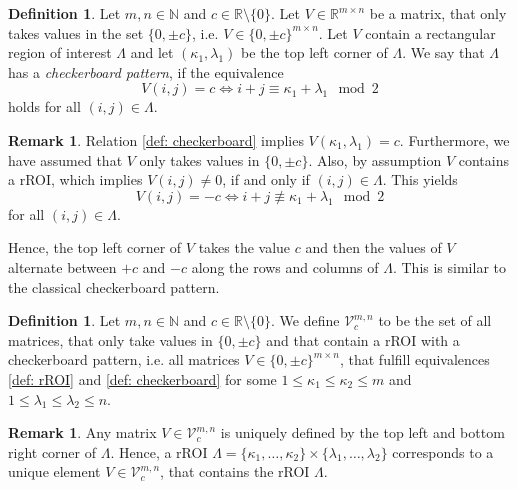 \documentclass[a4paper,12pt]{article}
\theoremstyle{plain}
\theoremstyle{definition}
\newtheorem{definition}[theorem]{Definition}
\newtheorem{remark}[theorem]{Remark}
\begin{document}
\begin{definition}
	Let $m, n \in \mathbb{N}$ and $c \in \mathbb{R} \setminus \{ 0 \}$. Let $V \in \mathbb{R}^{m \times n}$ be a matrix, that only takes values in the set $\{ 0, \pm c \}$, i.e. $V \in \{ 0, \pm c \}^{m \times n}$. Let $V$ contain a rectangular region of interest $\varLambda$ and let $(\kappa_1, \lambda_1)$ be the top left corner of $\varLambda$. We say that $\varLambda$ has a \emph{checkerboard pattern}, if the equivalence
	\begin{equation}\label{def: checkerboard}
		V(i, j) = c \Leftrightarrow i + j \equiv \kappa_1 + \lambda_1 \mod 2
	\end{equation}
	holds for all $(i, j) \in \varLambda$.
\end{definition}

\begin{remark}
	Relation \eqref{def: checkerboard} implies $V(\kappa_1, \lambda_1) = c$. Furthermore, we have assumed that $V$ only takes values in $\{ 0, \pm c \}$. Also, by assumption $V$ contains a rROI, which implies $V(i,j) \neq 0$, if and only if $(i, j) \in \varLambda$. This yields
	\begin{equation*}
		V(i, j) = - c \Leftrightarrow i + j \not\equiv \kappa_1 + \lambda_1 \mod 2
	\end{equation*}
	for all $(i, j) \in \varLambda$.
\end{remark}

Hence, the top left corner of $V$ takes the value $c$ and then the values of $V$ alternate between $+c$ and $-c$ along the rows and columns of $\varLambda$. This is similar to the classical checkerboard pattern.

\begin{definition}
	Let $m, n \in \mathbb{N}$ and $c \in \mathbb{R} \setminus \{ 0 \}$. We define $\mathcal{V}_c^{m, n}$ to be the set of all matrices, that only take values in $\{ 0, \pm c \}$ and that contain a rROI with a checkerboard pattern, i.e. all matrices  $V \in \{ 0, \pm c \}^{m \times n}$, that fulfill equivalences \eqref{def: rROI} and \eqref{def: checkerboard} for some $1 \leq \kappa_1 \leq \kappa_2 \leq m$ and $1 \leq \lambda_1 \leq \lambda_2 \leq n$.
\end{definition}

\begin{remark}
	Any matrix $V \in \mathcal{V}_c^{m, n}$ is uniquely defined by the top left and bottom right corner of $\varLambda$. Hence, a rROI $\varLambda = \{ \kappa_1, \dots, \kappa_2 \} \times \{ \lambda_1, \dots, \lambda_2 \}$ corresponds to a unique element $V \in \mathcal{V}_c^{m, n}$, that contains the rROI $\varLambda$.
\end{remark}
\end{document}
